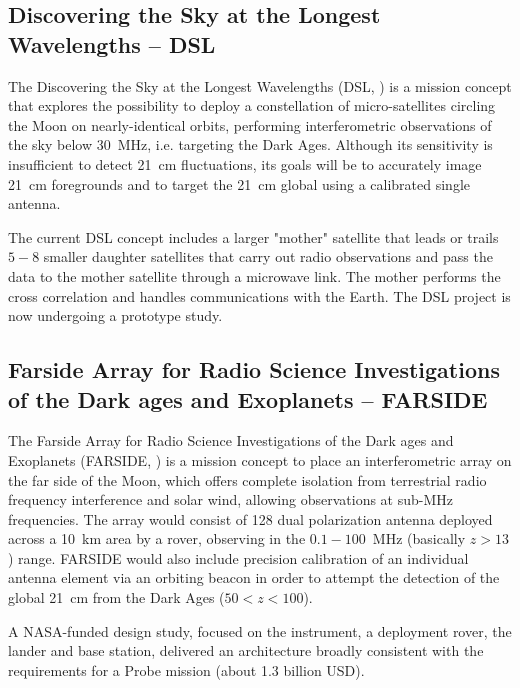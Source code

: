 \subsection{Discovering the Sky at the Longest Wavelengths -- DSL}

The Discovering the Sky at the Longest Wavelengths (DSL, \cite{chen19}) is a mission concept that explores the possibility to deploy a constellation of micro-satellites circling the Moon on nearly-identical orbits, performing interferometric observations of the sky below 30~MHz, i.e. targeting the Dark Ages. 
Although its sensitivity is insufficient to detect 21~cm fluctuations, its goals will be to accurately image 21~cm foregrounds and to target the 21~cm global using a calibrated single antenna. 

The current DSL concept includes a larger "mother" satellite that leads or trails $5-8$ smaller daughter satellites that carry out radio observations and pass the data to the mother satellite through a microwave link. The mother performs the cross correlation and handles communications with the Earth. 
The DSL project is now undergoing a prototype study.




\subsection{Farside Array for Radio Science Investigations of the Dark ages and Exoplanets -- FARSIDE}

The Farside Array for Radio Science Investigations of the Dark ages and Exoplanets (FARSIDE, \cite{burns19b}) is a mission concept to place an interferometric array on the far side of the Moon, which offers complete isolation from terrestrial radio frequency interference and solar wind, allowing observations at sub-MHz frequencies. The array would consist of 128 dual polarization antenna deployed across a 10~km area by a rover, observing in the $0.1-100$~MHz (basically $z > 13$) range. FARSIDE would also include precision calibration of an individual antenna element via an orbiting beacon in order to attempt the detection of the global 21~cm from the Dark Ages ($50 < z < 100$).

A NASA-funded design study, focused on the instrument, a deployment rover, the lander and base station, delivered an architecture broadly consistent with the requirements for a Probe mission (about 1.3 billion USD).






